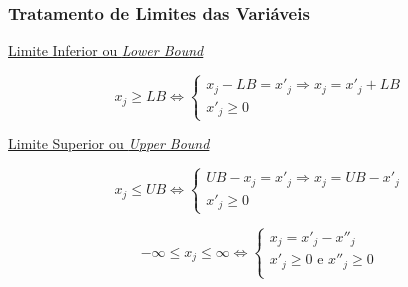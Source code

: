 \documentclass{beamer}
\begin{document}
\begin{frame}
	\frametitle{Tratamento de Limites das Variáveis}
	{
	\underline{Limite Inferior ou \textit{Lower  Bound}}
	\begin{mdframed}[backgroundcolor=blue!20]
		\begin{equation*}
			x_j \ge LB \Leftrightarrow
			\left\{ \begin{matrix}
						x_j - LB = {x}'_j \Rightarrow x_j = {x}'_j + LB \\
						{x}'_j \ge 0
					\end{matrix}  
			\right.
		\end{equation*}
	\end{mdframed}	
	}
	
	{
	\vspace{0.5cm}
	\underline{Limite Superior ou \textit{Upper  Bound}}
	\begin{mdframed}[backgroundcolor=red!20]
		\begin{equation*}
			x_j \le UB \Leftrightarrow
			\left\{ \begin{matrix}
						UB - x_j = {x}'_j \Rightarrow x_j = UB - {x}'_j  \\
						{x}'_j \ge 0
					\end{matrix}  
			\right.
		\end{equation*}
	\end{mdframed}
	}

	{
	\vspace{0.5cm}
	\begin{mdframed}[backgroundcolor=green!20]
		\begin{equation*}
			- \infty \le x_j \le \infty \Leftrightarrow
			\left\{ \begin{matrix}
						x_j = {x}'_j - {x}''_j \\
						{x}'_j \ge 0 \text{ e } {x}''_j \ge 0  \\
					\end{matrix}  
			\right.
		\end{equation*}
	\end{mdframed}
	}
\end{frame}
\end{document}
